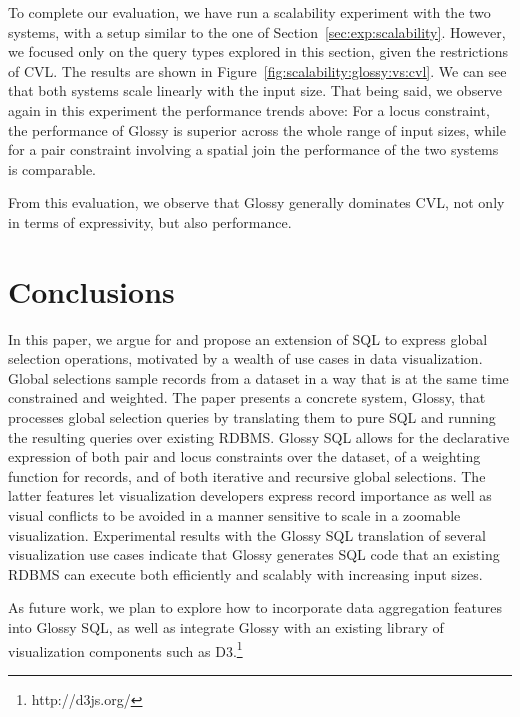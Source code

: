 \documentclass[11pt, oneside]{report}
\begin{document}
{To complete our evaluation, we have run a scalability experiment with the two systems, with a setup similar to the one of Section~\ref{sec:exp:scalability}. However, we focused only on the query types explored in this section, given the restrictions of CVL. The results are shown in Figure~\ref{fig:scalability:glossy:vs:cvl}. We can see that both systems scale linearly with the input size. That being said, we observe again in this experiment the performance trends above: For a locus constraint, the performance of Glossy is superior across the whole range of input sizes, while for a pair constraint involving a spatial join the performance of the two systems is comparable. 

From this evaluation, we observe that Glossy generally dominates CVL, not only in terms of expressivity, but also performance.  


\section{Conclusions}

In this paper, we argue for and propose an extension of SQL to express global selection operations, motivated by a wealth of use cases in data visualization. Global selections sample records from a dataset in a way that is at the same time constrained and weighted. The paper presents a concrete system, Glossy, that processes global selection queries by translating them to pure SQL and running the resulting queries over existing RDBMS. Glossy SQL allows for the declarative expression of both pair and locus constraints over the dataset, of a weighting function for records, and of both iterative and recursive global selections. The latter features let visualization developers express record importance as well as visual conflicts to be avoided in a manner sensitive to scale in a zoomable visualization. Experimental results with the Glossy SQL translation of several visualization use cases indicate that Glossy generates SQL code that an existing RDBMS can execute both efficiently and scalably with increasing input sizes. 

As future work, we plan to explore how to incorporate data aggregation features into Glossy SQL, as well as integrate Glossy with an existing library of visualization components such as D3.\footnote{http://d3js.org/}


}
\end{document}
